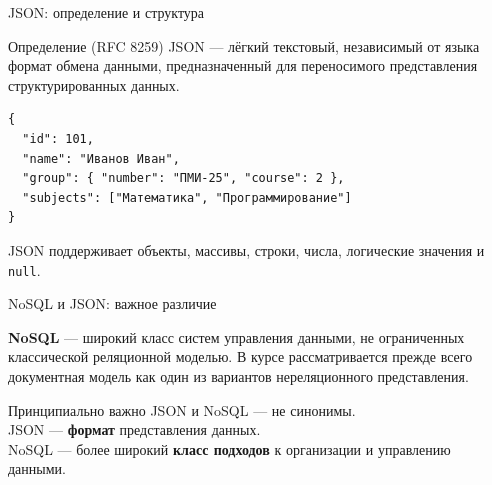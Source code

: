 \documentclass[aspectratio=169]{beamer}
\begin{document}
\begin{frame}[fragile]{JSON: определение и структура}

\begin{block}{Определение (RFC 8259)}
JSON — лёгкий текстовый, независимый от языка формат
обмена данными, предназначенный для переносимого
представления структурированных данных.
\end{block}

\vspace{0.3cm}
\small
\begin{verbatim}
{
  "id": 101,
  "name": "Иванов Иван",
  "group": { "number": "ПМИ-25", "course": 2 },
  "subjects": ["Математика", "Программирование"]
}
\end{verbatim}
\normalsize

JSON поддерживает объекты, массивы, строки, числа,
логические значения и \texttt{null}.

\end{frame}


\begin{frame}{NoSQL и JSON: важное различие}

\textbf{NoSQL} — широкий класс систем управления данными,
не ограниченных классической реляционной моделью.
В курсе рассматривается прежде всего документная модель
как один из вариантов нереляционного представления.

\vspace{0.5cm}

\begin{alertblock}{Принципиально важно}
JSON и NoSQL — не синонимы.\\[2pt]
JSON — \textbf{формат} представления данных.\\
NoSQL — более широкий \textbf{класс подходов}
к организации и управлению данными.
\end{alertblock}

\end{frame}
\end{document}
